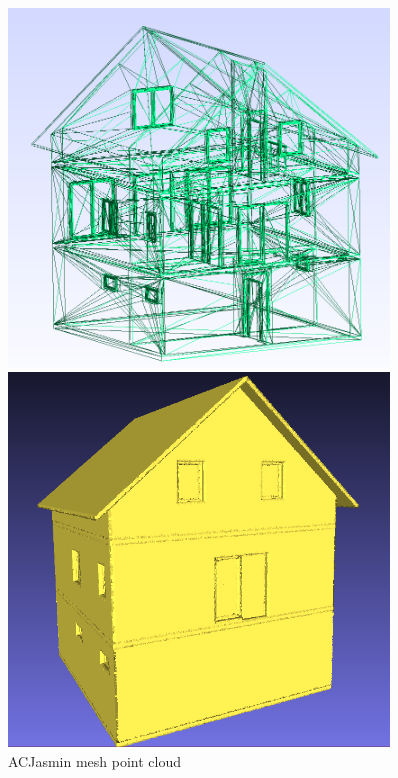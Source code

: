\documentclass[10pt]{beamer}
\begin{document}
\begin{frame}
    \begin{figure}
        \begin{minipage}{0.45\textwidth}
            \centering
            \includegraphics[width=0.9\textwidth]{../image/jasmin_stl.png}
        \end{minipage}
        \begin{minipage}{0.45\textwidth}
            \centering
            \includegraphics[width=0.9\textwidth]{../image/jasmin_ply.png}
        \end{minipage}
        \caption{ACJasmin mesh point cloud }
    \end{figure}
\end{frame}
\end{document}
